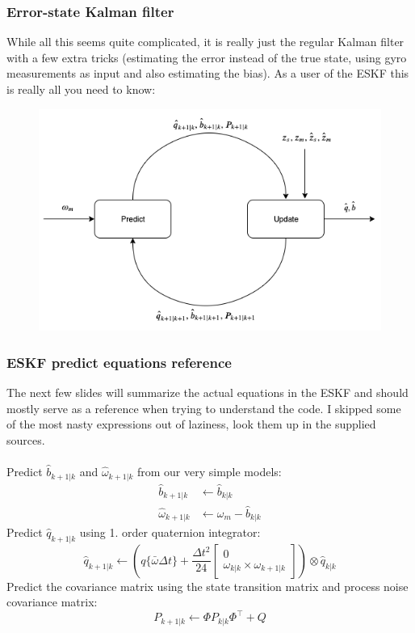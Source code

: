 \documentclass{beamer}
\begin{document}
\begin{frame}
    \frametitle{Error-state Kalman filter}
    While all this seems quite complicated, it is really just the regular Kalman filter with a few extra tricks (estimating the error instead of the true state, using gyro measurements as input and also estimating the bias). As a user of the ESKF this is really all you need to know:
    \begin{figure}
        \includegraphics[width=0.7\linewidth]{ESKF.png}
    \end{figure}
\end{frame}

\begin{frame}
    \frametitle{ESKF predict equations reference}
    The next few slides will summarize the actual equations in the ESKF and should mostly serve as a reference when trying to understand the code. I skipped some of the most nasty expressions out of laziness, look them up in the supplied sources.\\~\\
    Predict $\hat{b}_{k+1|k}$ and $\hat{\omega}_{k+1|k}$ from our very simple models:
    \begin{align}
        \hat{b}_{k+1|k} &\leftarrow \hat{b}_{k|k} \\
        \hat{\omega}_{k+1|k} &\leftarrow \omega_m - \hat{b}_{k|k}
    \end{align}
    Predict $\hat{q}_{k+1|k}$ using 1. order quaternion integrator:
    \begin{equation}
        \hat{q}_{k+1|k} \leftarrow \left({q}\{\bar{\omega} \Delta t\}+\frac{\Delta t^{2}}{24}\left[\begin{array}{c}{0} \\ {\omega_{k|k} \times \omega_{k+1|k}}\end{array}\right]\right) \otimes \hat{q}_{k|k}
    \end{equation}
    Predict the covariance matrix using the state transition matrix and process noise covariance matrix:
\begin{equation}
    {P}_{k+1 | k} \leftarrow {\Phi} {P}_{k | k} {\Phi}^{\top}+{Q}
\end{equation}
\end{frame}
\end{document}
